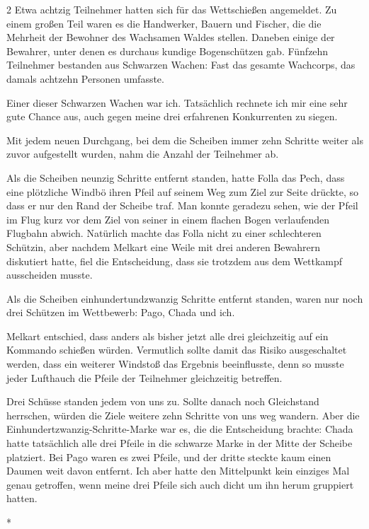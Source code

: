 \documentclass[10pt, a4paper, oneside]{book}
\begin{document}
\begin{multicols}{2}
Etwa achtzig Teilnehmer hatten sich für das Wettschießen angemeldet. Zu einem großen Teil waren es die Handwerker, Bauern und Fischer, die die Mehrheit der Bewohner des Wachsamen Waldes stellen. Daneben einige der Bewahrer, unter denen es durchaus kundige Bogenschützen gab. Fünfzehn Teilnehmer bestanden aus Schwarzen Wachen: Fast das gesamte Wachcorps, das damals achtzehn Personen umfasste.

Einer dieser Schwarzen Wachen war ich. Tatsächlich rechnete ich mir eine sehr gute Chance aus, auch gegen meine drei erfahrenen Konkurrenten zu siegen.

Mit jedem neuen Durchgang, bei dem die Scheiben immer zehn Schritte weiter als zuvor aufgestellt wurden, nahm die Anzahl der Teilnehmer ab. 

Als die Scheiben neunzig Schritte entfernt standen, hatte Folla das Pech, dass eine plötzliche Windbö ihren Pfeil auf seinem Weg zum Ziel zur Seite drückte, so dass er nur den Rand der Scheibe traf. Man konnte geradezu sehen, wie der Pfeil im Flug kurz vor dem Ziel von seiner in einem flachen Bogen verlaufenden Flugbahn abwich. Natürlich machte das Folla nicht zu einer schlechteren Schützin, aber nachdem Melkart eine Weile mit drei anderen Bewahrern diskutiert hatte, fiel die Entscheidung, dass sie trotzdem aus dem Wettkampf ausscheiden musste.

Als die Scheiben einhundertundzwanzig Schritte entfernt standen, waren nur noch drei Schützen im Wettbewerb: Pago, Chada und ich.

Melkart entschied, dass anders als bisher jetzt alle drei gleichzeitig auf ein Kommando schießen würden. Vermutlich sollte damit das Risiko ausgeschaltet werden, dass ein weiterer Windstoß das Ergebnis beeinflusste, denn so musste jeder Lufthauch die Pfeile der Teilnehmer gleichzeitig betreffen.

Drei Schüsse standen jedem von uns zu. Sollte danach noch Gleichstand herrschen, würden die Ziele weitere zehn Schritte von uns weg wandern. Aber die Einhundertzwanzig-Schritte-Marke war es, die die Entscheidung brachte: Chada hatte tatsächlich alle drei Pfeile in die schwarze Marke in der Mitte der Scheibe platziert. Bei Pago waren es zwei Pfeile, und der dritte steckte kaum einen Daumen weit davon entfernt. Ich aber hatte den Mittelpunkt kein einziges Mal genau getroffen, wenn meine drei Pfeile sich auch dicht um ihn herum gruppiert hatten.

\begin{center}
    *
\end{center}


\end{multicols}
\end{document}
